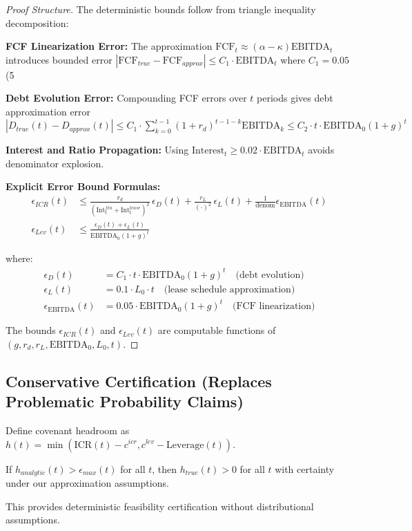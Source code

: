 \begin{proof}[Proof Structure]
The deterministic bounds follow from triangle inequality decomposition:

\textbf{FCF Linearization Error:} The approximation $\text{FCF}_t \approx (\alpha - \kappa) \text{EBITDA}_t$ introduces bounded error 
$|\text{FCF}_{true} - \text{FCF}_{approx}| \leq C_1 \cdot \text{EBITDA}_t$ where $C_1 = 0.05$ (5%

\textbf{Debt Evolution Error:} Compounding FCF errors over $t$ periods gives debt approximation error 
$|D_{true}(t) - D_{approx}(t)| \leq C_1 \cdot \sum_{k=0}^{t-1} (1+r_d)^{t-1-k} \text{EBITDA}_k \leq C_2 \cdot t \cdot \text{EBITDA}_0(1+g)^t$

\textbf{Interest and Ratio Propagation:} Using $\text{Interest}_t \geq 0.02 \cdot \text{EBITDA}_t$ avoids denominator explosion.

\textbf{Explicit Error Bound Formulas:}
\begin{align}
\epsilon_{ICR}(t) &\leq \frac{r_d}{(\text{Int}^{fin}_t+\text{Int}^{lease}_t)^2}\,\epsilon_D(t) + \frac{r_L}{(\cdot)^2}\,\epsilon_L(t) + \frac{1}{\text{denom}}\epsilon_{\text{EBITDA}}(t) \\
\epsilon_{Lev}(t) &\leq \frac{\epsilon_D(t) + \epsilon_L(t)}{\text{EBITDA}_0(1+g)^t}
\end{align}

where:
\begin{align}
\epsilon_D(t) &= C_1 \cdot t \cdot \text{EBITDA}_0(1+g)^t \quad \text{(debt evolution)} \\
\epsilon_L(t) &= 0.1 \cdot L_0 \cdot t \quad \text{(lease schedule approximation)} \\
\epsilon_{\text{EBITDA}}(t) &= 0.05 \cdot \text{EBITDA}_0(1+g)^t \quad \text{(FCF linearization)}
\end{align}

The bounds $\epsilon_{ICR}(t)$ and $\epsilon_{Lev}(t)$ are computable functions of $(g, r_d, r_L, \text{EBITDA}_0, L_0, t)$.
\end{proof}

\subsection{Conservative Certification (Replaces Problematic Probability Claims)}

\begin{proposition}
Define covenant headroom as $h(t) = \min(\text{ICR}(t) - c^{icr}, c^{lev} - \text{Leverage}(t))$.

If $h_{analytic}(t) > \epsilon_{max}(t)$ for all $t$, then $h_{true}(t) > 0$ for all $t$ with certainty under our approximation assumptions.

This provides deterministic feasibility certification without distributional assumptions.
\end{proposition}


